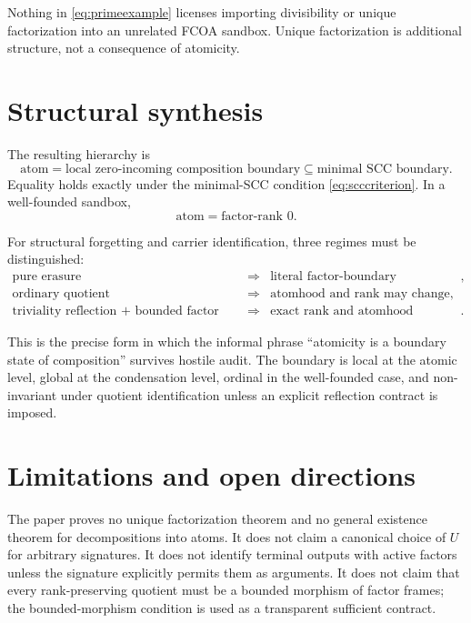 \documentclass[11pt]{article}
\theoremstyle{definition}
\theoremstyle{remark}
\begin{document}
Nothing in \eqref{eq:primeexample} licenses importing divisibility or unique factorization into an unrelated FCOA sandbox. Unique factorization is additional structure, not a consequence of atomicity.

\section{Structural synthesis}

The resulting hierarchy is
\begin{equation}
\boxed{
\text{atom}
=
\text{local zero-incoming composition boundary}
\subseteq
\text{minimal SCC boundary}.}
\label{eq:synthesis1}
\end{equation}
Equality holds exactly under the minimal-SCC condition \eqref{eq:scccriterion}. In a well-founded sandbox,
\begin{equation}
\boxed{\text{atom}=\text{factor-rank }0.}
\label{eq:synthesis2}
\end{equation}

For structural forgetting and carrier identification, three regimes must be distinguished:
\begin{equation}
\boxed{
\begin{array}{rcl}
\text{pure erasure}&\Rightarrow&\text{literal factor-boundary preservation},\\[2mm]
\text{ordinary quotient}&\Rightarrow&\text{atomhood and rank may change},\\[2mm]
\text{triviality reflection + bounded factor morphism}
&\Rightarrow&\text{exact rank and atomhood preservation}.
\end{array}}
\label{eq:synthesis3}
\end{equation}

This is the precise form in which the informal phrase ``atomicity is a boundary state of composition'' survives hostile audit. The boundary is local at the atomic level, global at the condensation level, ordinal in the well-founded case, and non-invariant under quotient identification unless an explicit reflection contract is imposed.

\section{Limitations and open directions}

The paper proves no unique factorization theorem and no general existence theorem for decompositions into atoms. It does not claim a canonical choice of \(U\) for arbitrary signatures. It does not identify terminal outputs with active factors unless the signature explicitly permits them as arguments. It does not claim that every rank-preserving quotient must be a bounded morphism of factor frames; the bounded-morphism condition is used as a transparent sufficient contract.
\end{document}
